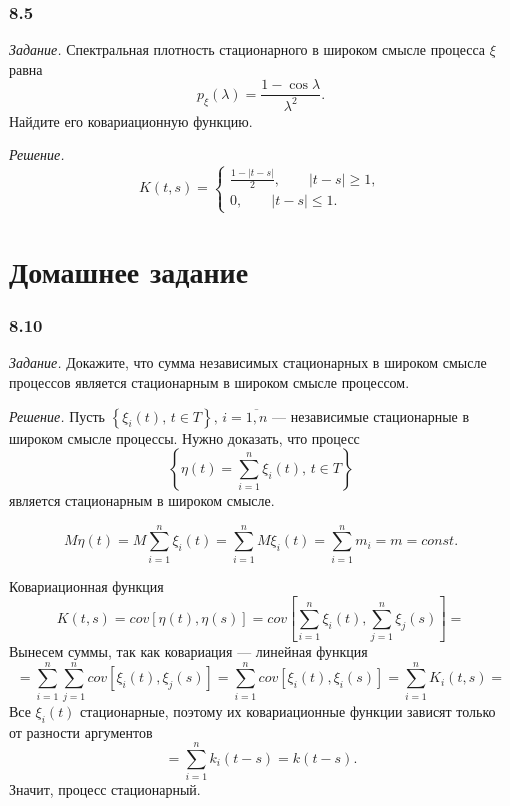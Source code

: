 \subsubsection*{8.5}

\textit{Задание.}
Спектральная плотность стационарного в широком смысле процесса $ \xi $ равна
$$p_{ \xi } \left( \lambda \right) =
  \frac{1 - \cos \lambda }{ \lambda^2}.$$
Найдите его ковариационную функцию.

\textit{Решение.}
$$K \left( t, s \right) =
  \begin{cases}
    \frac{1 - \left| t - s \right| }{2}, \qquad \left| t - s \right| \geq 1, \\
    0, \qquad \left| t - s \right| \leq 1.
  \end{cases}$$

\section*{Домашнее задание}

\subsubsection*{8.10}

\textit{Задание.}
Докажите, что сумма независимых стационарных в широком смысле процессов является стационарным в
широком смысле процессом.

\textit{Решение.}
Пусть $ \left\{ \xi_i \left( t \right), \, t \in T \right\}, \, i = \overline{1, n}$ ---
независимые стационарные в широком смысле процессы.
Нужно доказать, что процесс
$$ \left\{
  \eta \left( t \right) = \sum \limits_{i = 1}^n \xi_i \left( t \right), \, t \in T \right\} $$
является стационарным в широком смысле.

$$M \eta \left( t \right) =
  M \sum \limits_{i = 1}^n \xi_i \left( t \right) =
  \sum \limits_{i = 1}^n M \xi_i \left( t \right) =
  \sum \limits_{i = 1}^n m_i =
  m =
  const.$$

Ковариационная функция
$$K \left( t, s \right) =
  cov \left[ \eta \left( t \right), \eta \left( s \right) \right] =
  cov \left[
    \sum \limits_{i = 1}^n \xi_i \left( t \right), \sum \limits_{j = 1}^n \xi_j \left( s \right)
  \right] =$$
Вынесем суммы, так как ковариация --- линейная функция
$$= \sum \limits_{i = 1}^n
    \sum \limits_{j = 1}^n cov \left[ \xi_i \left( t \right), \xi_j \left( s \right) \right] =
  \sum \limits_{i = 1}^n cov \left[ \xi_i \left( t \right), \xi_i \left( s \right) \right] =
  \sum \limits_{i = 1}^n K_i \left( t, s \right) =$$
Все $ \xi_i \left( t \right) $ стационарные,
поэтому их ковариационные функции зависят только от разности аргументов
$$= \sum \limits_{i = 1}^n k_i \left( t - s \right) =
  k \left( t - s \right).$$
Значит, процесс стационарный.

